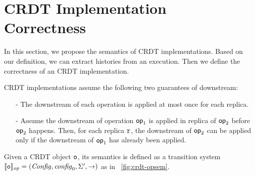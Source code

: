 
\section{CRDT Implementation Correctness}
\label{sec:CRDT implementation semantics and correctness}

In this section, we propose the semantics of CRDT implementations. Based on our definition, we can extract histories from an execution. Then we define the correctness of an CRDT implementation. 




CRDT implementations assume the following two guarantees of downstream:

\begin{itemize}
\setlength{\itemsep}{0.5pt}
\item[-] The downstream of each operation is applied at most once for each replica. 
\item[-] Assume the downstream of operation $\mathsf{op}_1$ is applied in replica of $\mathsf{op}_2$ before $\mathsf{op}_2$ happens. Then, for each replica $\mathtt{r}$, the downstream of $\mathsf{op}_2$ can be applied only if the downstream of $\mathsf{op}_1$ has already been applied. 
\end{itemize}

Given a CRDT object $\mathtt{o}$, its semantics is defined as a transition system $\llbracket \mathtt{o} \rrbracket_{\mathit{op}} = (\mathit{Config},\mathit{config}_0,\Sigma',\rightarrow)$ as in \figurename~\ref{fig:crdt-opsem}.
 



